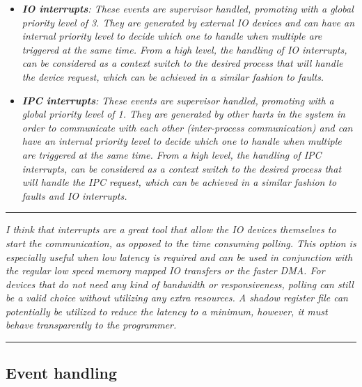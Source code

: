 \documentclass{article}
\begin{document}
            \begin{itemize}

                \item \textit{\textbf{IO interrupts}: These events are supervisor handled, promoting with a global priority level of 3. They are generated by external IO devices and can have an internal priority level to decide which one to handle when multiple are triggered at the same time. From a high level, the handling of IO interrupts, can be considered as a context switch to the desired process that will handle the device request, which can be achieved in a similar fashion to faults.}

                \item \textit{\textbf{IPC interrupts}: These events are supervisor handled, promoting with a global priority level of 1. They are generated by other harts in the system in order to communicate with each other (inter-process communication) and can have an internal priority level to decide which one to handle when multiple are triggered at the same time. From a high level, the handling of IPC interrupts, can be considered as a context switch to the desired process that will handle the IPC request, which can be achieved in a similar fashion to faults and IO interrupts.}

            \end{itemize}

        \par\noindent\rule{\textwidth}{0.4pt}
        \textit{I think that interrupts are a great tool that allow the IO devices themselves to start the communication, as opposed to the time consuming polling. This option is especially useful when low latency is required and can be used in conjunction with the regular low speed memory mapped IO transfers or the faster DMA. For devices that do not need any kind of bandwidth or responsiveness, polling can still be a valid choice without utilizing any extra resources. A shadow register file can potentially be utilized to reduce the latency to a minimum, however, it must behave transparently to the programmer.}
        \par\noindent\rule{\textwidth}{0.4pt}

        \subsection{Event handling}

            \vspace{10pt}
\end{document}
